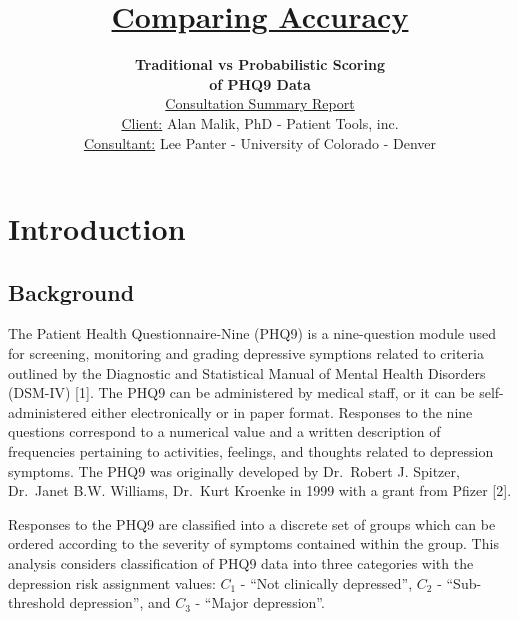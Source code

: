 \documentclass[12pt,]{article}
\title{\vspace{1.5in} \textbf{\underline{Comparing Accuracy}}}
\subtitle{\vspace{0.35in} \textbf{Traditional vs Probabilistic Scoring}\\
\textbf{of PHQ9 Data}\\
\vspace{0.5in} \underline{Consultation Summary Report }\\
\vspace{0.5in} \underline{Client:} \hspace{10pt} Alan Malik, PhD -
Patient Tools, inc.\\
\vspace{0.25in} \underline{Consultant:} \hspace{10pt} Lee Panter -
University of Colorado - Denver}
\author{}
\date{}
\begin{document}
\maketitle

\thispagestyle{empty}

\newpage

\thispagestyle{empty}

\setcounter{secnumdepth}{4}
\setcounter{tocdepth}{4}
\begin{singlespace}
\tableofcontents
\end{singlespace}

\newpage


\hypertarget{introduction}{%
\section{Introduction}\label{introduction}}

\hypertarget{background}{%
\subsection{Background}\label{background}}

The Patient Health Questionnaire-Nine (PHQ9) is a nine-question module
used for screening, monitoring and grading depressive symptions related
to criteria outlined by the Diagnostic and Statistical Manual of Mental
Health Disorders (DSM-IV) {[}1{]}. The PHQ9 can be administered by
medical staff, or it can be self-administered either electronically or
in paper format. Responses to the nine questions correspond to a
numerical value and a written description of frequencies pertaining to
activities, feelings, and thoughts related to depression symptoms. The
PHQ9 was originally developed by Dr.~Robert J. Spitzer, Dr.~Janet B.W.
Williams, Dr.~Kurt Kroenke in 1999 with a grant from Pfizer {[}2{]}.

Responses to the PHQ9 are classified into a discrete set of groups which
can be ordered according to the severity of symptoms contained within
the group. This analysis considers classification of PHQ9 data into
three categories with the depression risk assignment values: \(C_{1}\) -
``Not clinically depressed'', \(C_{2}\) - ``Sub-threshold depression'',
and \(C_{3}\) - ``Major depression''.
\end{document}
